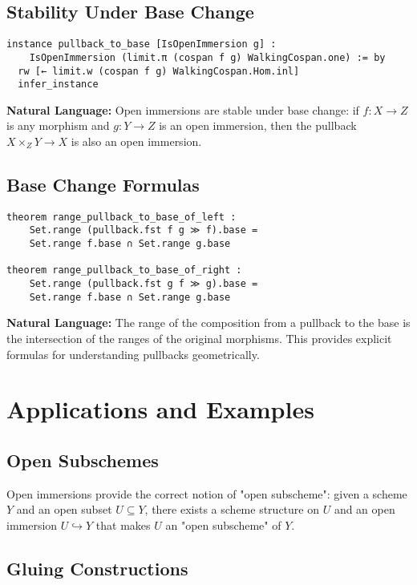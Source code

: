 \documentclass{article}
\theoremstyle{definition}
\begin{document}
\subsection{Stability Under Base Change}

\begin{lstlisting}
instance pullback_to_base [IsOpenImmersion g] :
    IsOpenImmersion (limit.π (cospan f g) WalkingCospan.one) := by
  rw [← limit.w (cospan f g) WalkingCospan.Hom.inl]
  infer_instance
\end{lstlisting}

\textbf{Natural Language:} Open immersions are stable under base change: if $f: X \to Z$ is any morphism and $g: Y \to Z$ is an open immersion, then the pullback $X \times_Z Y \to X$ is also an open immersion.

\subsection{Base Change Formulas}

\begin{lstlisting}
theorem range_pullback_to_base_of_left :
    Set.range (pullback.fst f g ≫ f).base =
    Set.range f.base ∩ Set.range g.base

theorem range_pullback_to_base_of_right :
    Set.range (pullback.fst g f ≫ g).base =
    Set.range f.base ∩ Set.range g.base
\end{lstlisting}

\textbf{Natural Language:} The range of the composition from a pullback to the base is the intersection of the ranges of the original morphisms. This provides explicit formulas for understanding pullbacks geometrically.

\section{Applications and Examples}

\subsection{Open Subschemes}

Open immersions provide the correct notion of "open subscheme": given a scheme $Y$ and an open subset $U \subseteq Y$, there exists a scheme structure on $U$ and an open immersion $U \hookrightarrow Y$ that makes $U$ an "open subscheme" of $Y$.

\subsection{Gluing Constructions}
\end{document}
